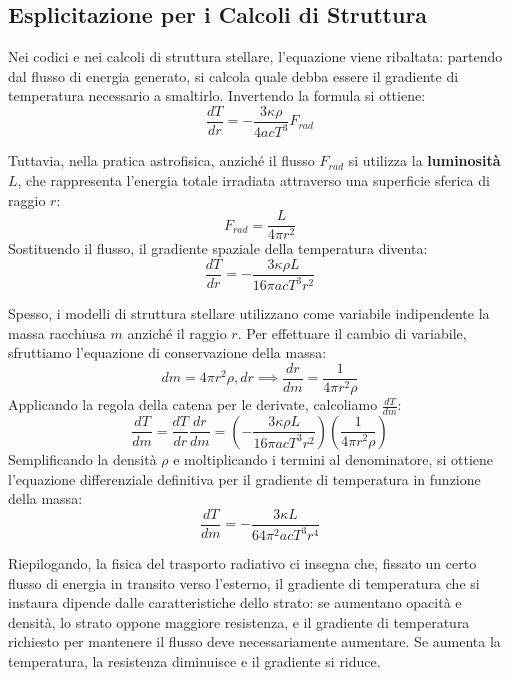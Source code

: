 \subsection{Esplicitazione per i Calcoli di Struttura}

Nei codici e nei calcoli di struttura stellare, l'equazione viene ribaltata: partendo dal flusso di energia generato, si calcola quale debba essere il gradiente di temperatura necessario a smaltirlo. Invertendo la formula si ottiene:
\begin{equation}
\frac{dT}{dr} = - \frac{3 \kappa \rho}{4 a c T^3} F_{rad}
\end{equation}

Tuttavia, nella pratica astrofisica, anziché il flusso $F_{rad}$ si utilizza la \textbf{luminosità} $L$, che rappresenta l'energia totale irradiata attraverso una superficie sferica di raggio $r$:
\begin{equation}
F_{rad} = \frac{L}{4 \pi r^2}
\end{equation}
Sostituendo il flusso, il gradiente spaziale della temperatura diventa:
\begin{equation}
\frac{dT}{dr} = - \frac{3 \kappa \rho L}{16 \pi a c T^3 r^2}
\end{equation}

Spesso, i modelli di struttura stellare utilizzano come variabile indipendente la massa racchiusa $m$ anziché il raggio $r$. Per effettuare il cambio di variabile, sfruttiamo l'equazione di conservazione della massa:
\begin{equation}
dm = 4 \pi r^2 \rho , dr \implies \frac{dr}{dm} = \frac{1}{4 \pi r^2 \rho}
\end{equation}
Applicando la regola della catena per le derivate, calcoliamo $\frac{dT}{dm}$:
\begin{equation}
\frac{dT}{dm} = \frac{dT}{dr} \frac{dr}{dm} = \left( - \frac{3 \kappa \rho L}{16 \pi a c T^3 r^2} \right) \left( \frac{1}{4 \pi r^2 \rho} \right)
\end{equation}
Semplificando la densità $\rho$ e moltiplicando i termini al denominatore, si ottiene l'equazione differenziale definitiva per il gradiente di temperatura in funzione della massa:
\begin{equation}
\frac{dT}{dm} = - \frac{3 \kappa L}{64 \pi^2 a c T^3 r^4}
\end{equation}

Riepilogando, la fisica del trasporto radiativo ci insegna che, fissato un certo flusso di energia in transito verso l'esterno, il gradiente di temperatura che si instaura dipende dalle caratteristiche dello strato: se aumentano opacità e densità, lo strato oppone maggiore resistenza, e il gradiente di temperatura richiesto per mantenere il flusso deve necessariamente aumentare. Se aumenta la temperatura, la resistenza diminuisce e il gradiente si riduce.

